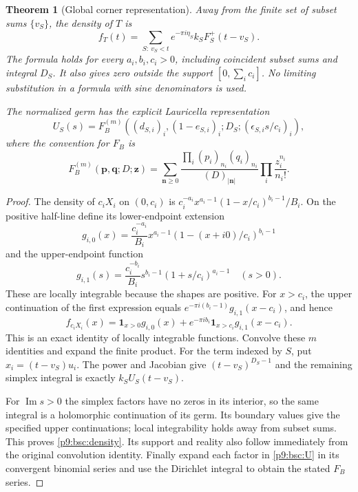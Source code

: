 \documentclass[11pt,a4paper]{article}
\newtheorem{theorem}{Theorem}[section]
\theoremstyle{definition}
\theoremstyle{remark}
\numberwithin{equation}{section}
\begin{document}
\begin{theorem}[Global corner representation]\label{p9:bsc:global}
Away from the finite set of subset sums $\{v_S\}$, the density of $T$ is
\begin{equation}\label{p9:bsc:density}
 f_T(t)=\sum_{S:\ v_S<t}e^{-\pi i\eta_S}k_S F_S^+(t-v_S).
\end{equation}
The formula holds for every $a_i,b_i,c_i>0$, including coincident
subset sums and integral $D_S$. It also gives zero outside the support
$[0,\sum_i c_i]$. No limiting substitution in a formula with sine
denominators is used.

The normalized germ has the explicit Lauricella representation
\[
 U_S(s)=F_B^{(m)}\!\left((d_{S,i})_i,(1-e_{S,i})_i;
                       D_S;(\epsilon_{S,i}s/c_i)_i\right),
\]
where the convention for $F_B$ is
\[
 F_B^{(m)}(\mathbf p,\mathbf q;D;\mathbf z)
 =\sum_{\mathbf n\ge0}
 \frac{\prod_i(p_i)_{n_i}(q_i)_{n_i}}{(D)_{|\mathbf n|}}
 \prod_i\frac{z_i^{n_i}}{n_i!}.
\]
\end{theorem}
\begin{proof}
The density of $c_iX_i$ on $(0,c_i)$ is
$c_i^{-a_i}x^{a_i-1}(1-x/c_i)^{b_i-1}/B_i$.
On the positive half-line define its lower-endpoint extension
\[
 g_{i,0}(x)=\frac{c_i^{-a_i}}{B_i}
 x^{a_i-1}(1-(x+i0)/c_i)^{b_i-1}
\]
and the upper-endpoint function
\[
 g_{i,1}(s)=\frac{c_i^{-b_i}}{B_i}
 s^{b_i-1}(1+s/c_i)^{a_i-1}\quad(s>0).
\]
These are locally integrable because the shapes are positive.
For $x>c_i$, the upper continuation of the first expression equals
$e^{-\pi i(b_i-1)}g_{i,1}(x-c_i)$, and hence
\[
 f_{c_iX_i}(x)=\mathbf1_{x>0}g_{i,0}(x)
       +e^{-\pi ib_i}\mathbf1_{x>c_i}g_{i,1}(x-c_i).
\]
This is an exact identity of locally integrable functions. Convolve
these $m$ identities and expand the finite product. For the term
indexed by $S$, put $x_i=(t-v_S)u_i$. The power and Jacobian give
$(t-v_S)^{D_S-1}$ and the remaining simplex integral is exactly
$k_SU_S(t-v_S)$.

For $\operatorname{Im}s>0$ the simplex factors have no zeros in its
interior, so the same integral is a holomorphic continuation of its
germ. Its boundary values give the specified upper continuations;
local integrability holds away from subset sums. This proves
\eqref{p9:bsc:density}. Its support and reality also follow immediately
from the original convolution identity. Finally expand each factor
in \eqref{p9:bsc:U} in its convergent binomial series and use the
Dirichlet integral to obtain the stated $F_B$ series.
\end{proof}
\end{document}
